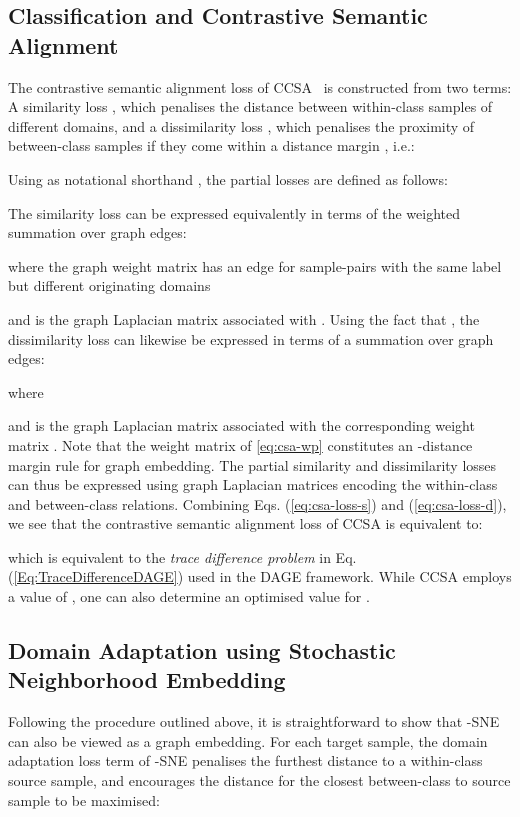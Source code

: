 \documentclass[journal]{IEEEtran}
\begin{document}
\subsection{Classification and Contrastive Semantic Alignment} \label{sec:dage-ccsa}
The contrastive semantic alignment loss of CCSA~\cite{motiian2017ccsa} is constructed from two terms: A similarity loss , which penalises the distance between within-class samples of different domains, and a dissimilarity loss , which penalises the proximity of between-class samples if they come within a distance margin , i.e.:

Using as notational shorthand , the partial losses are defined as follows:

The similarity loss can be expressed equivalently in terms of the weighted summation over graph edges:

where the graph weight matrix  has an edge for sample-pairs with the same label but different originating domains

and  is the graph Laplacian matrix associated with .
Using the fact that , the dissimilarity loss can likewise be expressed in terms of a summation over graph edges:

where

and  is the graph Laplacian matrix associated with the corresponding weight matrix . Note that the weight matrix of \cref{eq:csa-wp} constitutes an -distance margin rule for graph embedding. 
The partial similarity and dissimilarity losses can thus be expressed using graph Laplacian matrices encoding the within-class and between-class relations. Combining Eqs. (\ref{eq:csa-loss-s}) and (\ref{eq:csa-loss-d}), we see that the contrastive semantic alignment loss of CCSA is equivalent to:

which is equivalent to the \textit{trace difference problem} in Eq. (\ref{Eq:TraceDifferenceDAGE}) used in the DAGE framework. While CCSA employs a value of , one can also determine an optimised value for . 



\subsection{Domain Adaptation using Stochastic Neighborhood Embedding} \label{sec:dage-dsne}
Following the procedure outlined above, it is straightforward to show that -SNE~\cite{xu2019dsne} can also be viewed as a graph embedding.
For each target sample, the domain adaptation loss term of -SNE penalises the furthest distance to a within-class source sample, and encourages the distance for the closest between-class to source sample to be maximised:
\end{document}
